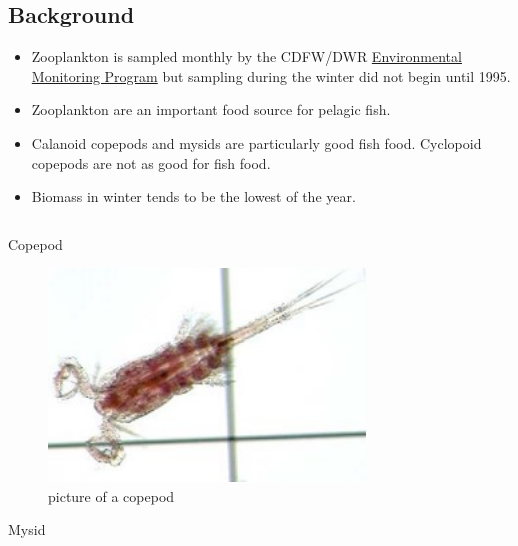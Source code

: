 \documentclass[
]{book}
\providecommand{\tightlist}{%
  \setlength{\itemsep}{0pt}\setlength{\parskip}{0pt}}
\begin{document}
\begin{columns-nocenter}

\begin{column}

\hypertarget{background-3}{%
\subsection{Background}\label{background-3}}

\begin{itemize}
\tightlist
\item
  Zooplankton is sampled monthly by the CDFW/DWR \href{https://emp.baydeltalive.com/wiki/12297}{Environmental Monitoring Program} but sampling during the winter did not begin until 1995.
\item
  Zooplankton are an important food source for pelagic fish.
\item
  Calanoid copepods and mysids are particularly good fish food. Cyclopoid copepods are not as good for fish food.
\item
  Biomass in winter tends to be the lowest of the year.
\end{itemize}

\end{column}

\begin{column}

Copepod

\begin{figure}

{\centering \includegraphics[width=3.31in]{figures/copepod} 

}

\caption{picture of a copepod}\label{fig:unnamed-chunk-162}
\end{figure}

Mysid

\begin{figure}


\end{figure}
\end{column}
\end{columns-nocenter}
\end{document}
